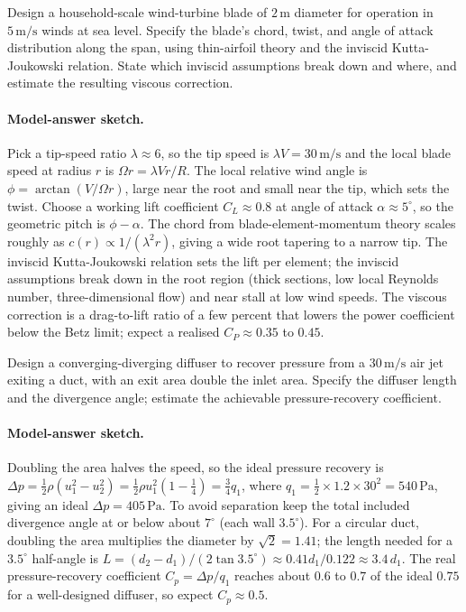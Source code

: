 \begin{exercise}
Design a household-scale wind-turbine blade of $2\,\si{\meter}$
diameter for operation in $5\,\si{\meter\per\second}$ winds at sea
level. Specify the blade's chord, twist, and angle of attack
distribution along the span, using thin-airfoil theory and the
inviscid Kutta-Joukowski relation. State which inviscid
assumptions break down and where, and estimate the resulting
viscous correction.

\paragraph{Model-answer sketch.} Pick a tip-speed ratio $\lambda
\approx 6$, so the tip speed is $\lambda V = 30\,\si{\meter\per
\second}$ and the local blade speed at radius $r$ is $\Omega r =
\lambda V r/R$. The local relative wind angle is $\phi = \arctan(V/
\Omega r)$, large near the root and small near the tip, which sets the
twist. Choose a working lift coefficient $C_L \approx 0.8$ at angle of
attack $\alpha \approx 5^\circ$, so the geometric pitch is $\phi -
\alpha$. The chord from blade-element-momentum theory scales roughly
as $c(r) \propto 1/(\lambda^2 r)$, giving a wide root tapering to a
narrow tip. The inviscid Kutta-Joukowski relation sets the lift per
element; the inviscid assumptions break down in the root region
(thick sections, low local Reynolds number, three-dimensional
flow) and near stall at low wind speeds. The viscous correction is a
drag-to-lift ratio of a few percent that lowers the power coefficient
below the Betz limit; expect a realised $C_P \approx 0.35$ to $0.45$.
\end{exercise}

\begin{exercise}
Design a converging-diverging diffuser to recover pressure from a
$30\,\si{\meter\per\second}$ air jet exiting a duct, with an exit
area double the inlet area. Specify the diffuser length and the
divergence angle; estimate the achievable pressure-recovery
coefficient.

\paragraph{Model-answer sketch.} Doubling the area halves the speed,
so the ideal pressure recovery is $\Delta p = \tfrac12\rho(u_1^2 -
u_2^2) = \tfrac12\rho u_1^2(1 - \tfrac14) = \tfrac34 q_1$, where $q_1
= \tfrac12\times 1.2\times 30^2 = 540\,\text{Pa}$, giving an ideal
$\Delta p = 405\,\text{Pa}$. To avoid separation keep the total
included divergence angle at or below about $7^\circ$ (each wall
$3.5^\circ$). For a circular duct, doubling the area multiplies the
diameter by $\sqrt2 = 1.41$; the length needed for a $3.5^\circ$
half-angle is $L = (d_2 - d_1)/(2\tan 3.5^\circ) \approx 0.41 d_1/
0.122 \approx 3.4\,d_1$. The real pressure-recovery coefficient
$C_p = \Delta p/q_1$ reaches about $0.6$ to $0.7$ of the ideal $0.75$
for a well-designed diffuser, so expect $C_p \approx 0.5$.
\end{exercise}

